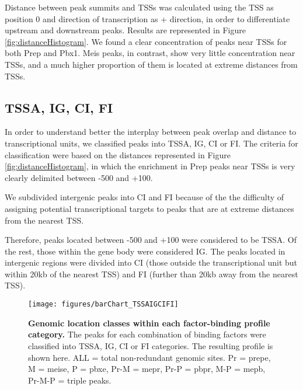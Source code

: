Distance between peak summits and \acp{TSS} was calculated using the \ac{TSS} as position 0 and direction of transcription as + direction, in order to differentiate upstream and downstream peaks. Results are represented in Figure \ref{fig:distanceHistogram}. We found a clear concentration of peaks near \ac{TSS}s for both Prep and Pbx1. Meis peaks, in contrast, show very little concentration near \acp{TSS}, and a much higher proportion of them is located at extreme distances from \acp{TSS}. %

\subsection{TSSA, IG, CI, FI}

In order to understand better the interplay between peak overlap and distance to transcriptional units, we classified peaks into \ac{TSSA}, \ac{IG}, \ac{CI} or \ac{FI}. The criteria for classification were based on the  distances represented in Figure \ref{fig:distanceHistogram}, in which the enrichment in Prep peaks near \acp{TSS} is very clearly delimited between -500 and +100. 

We subdivided intergenic peaks into \ac{CI} and \ac{FI} because of the the difficulty of assigning potential transcriptional targets to peaks that are at extreme distances from the nearest \ac{TSS}.%

Therefore, peaks located between -500 and +100 were considered to be \ac{TSSA}. Of the rest, those within the gene body were considered \ac{IG}. The peaks located in intergenic regions were divided into \ac{CI} (those outside the transcriptional unit but within 20kb of the nearest \ac{TSS}) and \ac{FI} (further than 20kb away from the nearest \ac{TSS}). 

\begin{figure}[]
  \centering
  \texttt{[image: figures/barChart\_TSSAIGCIFI]}
  \caption[Genomic location classes within each factor-binding profile category]{\textbf{Genomic location classes within each factor-binding profile category.} The peaks for each combination of binding factors were classified into \ac{TSSA}, \ac{IG}, \ac{CI} or \ac{FI} categories. The resulting profile is shown here. ALL = total non-redundant genomic sites. Pr = \ac{prepe}, M = \ac{meise}, P = \ac{pbxe}, Pr-M = \ac{mepr}, Pr-P = \ac{pbpr}, M-P = \ac{mepb}, Pr-M-P = triple peaks.}
  \label{fig:distanceBarChart}
\end{figure}

